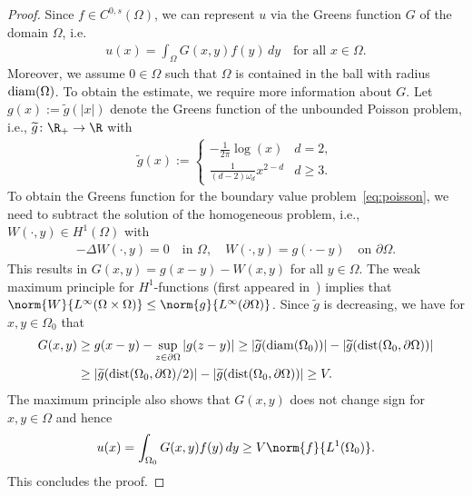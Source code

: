 \documentclass{amsart}[11pt]
\numberwithin{equation}{section}
\numberwithin{theorem}{section}
\begin{document}
    \begin{proof}
        Since $f\in C^{0,s}(\Omega)$, we can represent $u$ via the Greens function $G$ of the domain $\Omega$, i.e.
        \begin{align*}
        u(x) = \int_{\Omega} G(x,y) f(y)\,dy\quad\text{for all }x\in \Omega.
        \end{align*}
        Moreover, we assume $0\in \Omega$ such that $\Omega$ is contained in the ball with radius ${\rm diam}(\Omega)$.
        To obtain the estimate, we require more information about $G$. Let $g(x):=\widetilde g(|x|)$ denote the Greens function of the unbounded Poisson problem, i.e., $\widetilde g\colon \R_+\to \R$ with
    \begin{align*}
    \widetilde g(x):=\begin{cases} -\frac{1}{2\pi}\log(x) & d=2,\\
    \frac{1}{(d-2)\omega_d}x^{2-d} & d\geq 3.
    \end{cases}
    \end{align*}
    To obtain the Greens function for the boundary value problem~\eqref{eq:poisson}, we need to subtract the solution of the homogeneous problem, i.e., $W(\cdot,y)\in H^1(\Omega)$ with
    \begin{align*}
    -\Delta W(\cdot, y)=0\quad\text{in }\Omega,\quad W(\cdot, y)=g(\cdot - y)\quad\text{on }\partial\Omega.
    \end{align*}
    This results in $G(x,y)= g(x-y) -W(x,y)$ for all $y\in\Omega$. The weak maximum principle for $H^1$-functions (first appeared in~\cite{weakmax}) implies that
    $\norm{W}{L^\infty(\Omega\times\Omega)}\leq \norm{g}{L^\infty(\partial\Omega)}$. 
    Since $\widetilde g$ is decreasing, we have for $x,y\in \Omega_0$ that
    \begin{align*}
    G(x,y) &\geq g(x - y) -  \sup_{z\in\partial\Omega}|g(z-y)|\geq |\widetilde g({\rm diam}(\Omega_0))| - |\widetilde g({\rm dist}(\Omega_0,\partial\Omega))|\\
    &\geq |\widetilde g({\rm dist}(\Omega_0,\partial\Omega)/2)| - |\widetilde g({\rm dist}(\Omega_0,\partial\Omega))|\geq V.
    \end{align*}
    The maximum principle also shows that $G(x,y)$ does not change sign for $x,y\in\Omega$ and hence
    \begin{align*}
    u(x) = \int_{\Omega_0} G(x,y)f(y)\,dy \geq V \norm{f}{L^1(\Omega_0)}.
    \end{align*}
    This concludes the proof.
    \end{proof}
\end{document}
